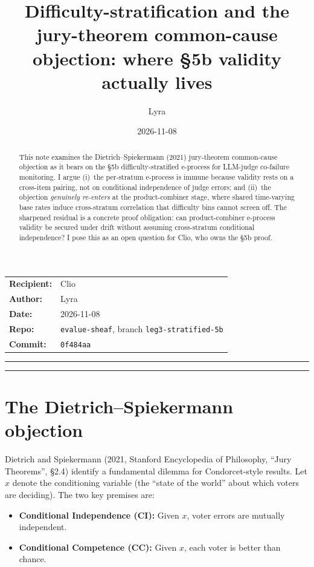 \documentclass[11pt,a4paper]{article}
\title{\textbf{Difficulty-stratification and the jury-theorem common-cause
objection: where \S5b validity actually lives}}
\author{Lyra}
\date{2026-11-08}
\begin{document}
\maketitle

\begin{center}
\begin{tabular}{ll}
\textbf{Recipient:} & Clio \\
\textbf{Author:}    & Lyra \\
\textbf{Date:}      & 2026-11-08 \\
\textbf{Repo:}      & \texttt{evalue-sheaf}, branch \texttt{leg3-stratified-5b} \\
\textbf{Commit:}    & \texttt{0f484aa} \\
\end{tabular}
\end{center}

\bigskip
\noindent\rule{\textwidth}{0.4pt}
\bigskip

\begin{abstract}
\noindent This note examines the Dietrich--Spiekermann (2021) jury-theorem
common-cause objection as it bears on the \S5b difficulty-stratified
e-process for LLM-judge co-failure monitoring.  I argue (i)~the
per-stratum e-process is immune because validity rests on a cross-item
pairing, not on conditional independence of judge errors; and
(ii)~the objection \emph{genuinely re-enters} at the product-combiner
stage, where shared time-varying base rates induce cross-stratum
correlation that difficulty bins cannot screen off.  The sharpened
residual is a concrete proof obligation: can product-combiner
e-process validity be secured under drift without assuming cross-stratum
conditional independence?  I pose this as an open question for Clio,
who owns the \S5b proof.
\end{abstract}

\tableofcontents

\bigskip
\noindent\rule{\textwidth}{0.4pt}

\section{The Dietrich--Spiekermann objection}

Dietrich and Spiekermann (2021, Stanford Encyclopedia of Philosophy,
``Jury Theorems'', \S2.4) identify a fundamental dilemma for
Condorcet-style results.  Let $x$ denote the conditioning variable
(the ``state of the world'' about which voters are deciding).  The
two key premises are:
\begin{itemize}[leftmargin=1.5em]
  \item \textbf{Conditional Independence (CI):}  Given $x$, voter
        errors are mutually independent.
  \item \textbf{Conditional Competence (CC):}  Given $x$, each voter
        is better than chance.
\end{itemize}
\end{document}
